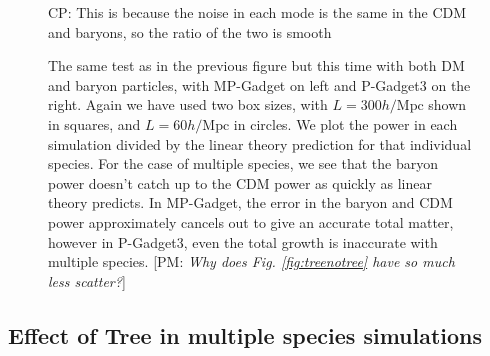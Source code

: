 \documentclass[]{article}
\def\pvm#1{[PM: {\it #1}] }
\newcommand{\CP}[1]{{\color{red}CP: #1}}
\begin{document}
\begin{figure}[h]
	\caption{The same test as in the previous figure but this time with both DM and baryon particles, with MP-Gadget on left and
P-Gadget3 on the right. Again we have used two box sizes, with $L=300h/\mathrm{Mpc}$ shown in squares,
and $L=60h/\mathrm{Mpc}$ in circles. We plot the power in each simulation divided by the linear theory
prediction for that individual species. For the case of multiple species, we see that the baryon power doesn't catch up to the CDM power as quickly as linear theory predicts. In MP-Gadget, the error in the baryon and CDM power approximately cancels out to give an accurate total matter, however in P-Gadget3, even the total growth is inaccurate with multiple species.
\pvm{Why does Fig. \ref{fig:treenotree} have so much less scatter?}}
\CP{This is because the noise in each mode is the same in the CDM and baryons, so the
ratio of the two is smooth}
\end{figure}

\clearpage

\subsection{Effect of Tree in multiple species simulations}
\end{document}
